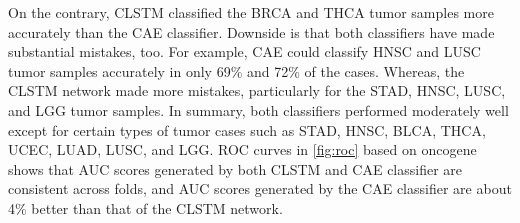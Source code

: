 \hspace*{3.5mm} On the contrary, CLSTM classified the BRCA and THCA tumor samples more accurately than the CAE classifier. Downside is that both classifiers have made substantial mistakes, too. For example, CAE could classify HNSC and LUSC tumor samples accurately in only 69\% and 72\% of the cases. Whereas, the CLSTM network made more mistakes, particularly for the STAD, HNSC, LUSC, and LGG tumor samples. In summary, both classifiers performed moderately well except for certain types of tumor cases such as STAD, HNSC, BLCA, THCA, UCEC, LUAD, LUSC, and LGG. ROC curves in \cref{fig:roc} based on oncogene shows that AUC scores generated by both CLSTM and CAE classifier are consistent across folds, and AUC scores generated by the CAE classifier are about 4\% better than that of the CLSTM network.

